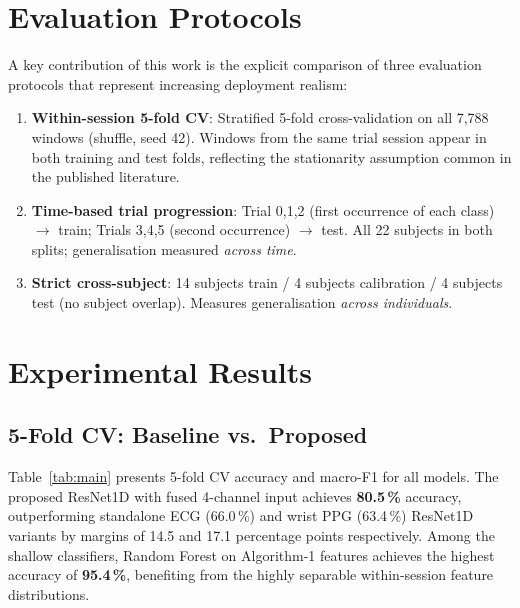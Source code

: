 \documentclass[conference]{IEEEtran}
\begin{document}
\section{Evaluation Protocols}
\label{sec:protocols}

A key contribution of this work is the explicit comparison of three evaluation protocols that represent increasing deployment realism:

\begin{enumerate}
    \item \textbf{Within-session 5-fold CV}: Stratified 5-fold cross-validation on all 7,788 windows (shuffle, seed 42). Windows from the same trial session appear in both training and test folds, reflecting the stationarity assumption common in the published literature.

    \item \textbf{Time-based trial progression}: Trial 0,1,2 (first occurrence of each class) $\to$ train; Trials 3,4,5 (second occurrence) $\to$ test. All 22 subjects in both splits; generalisation measured \emph{across time}.

    \item \textbf{Strict cross-subject}: 14 subjects train / 4 subjects calibration / 4 subjects test (no subject overlap). Measures generalisation \emph{across individuals}.
\end{enumerate}

\section{Experimental Results}
\label{sec:results}

\subsection{5-Fold CV: Baseline vs.\ Proposed}

Table~\ref{tab:main} presents 5-fold CV accuracy and macro-F1 for all models. The proposed ResNet1D with fused 4-channel input achieves \textbf{80.5\,\%} accuracy, outperforming standalone ECG (66.0\,\%) and wrist PPG (63.4\,\%) ResNet1D variants by margins of 14.5 and 17.1 percentage points respectively. Among the shallow classifiers, Random Forest on Algorithm-1 features achieves the highest accuracy of \textbf{95.4\,\%}, benefiting from the highly separable within-session feature distributions.
\end{document}
